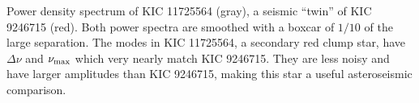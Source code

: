 \label{fig:twin}
Power density spectrum of KIC 11725564 (gray), a seismic ``twin'' of KIC 9246715 (red). Both power spectra are smoothed with a boxcar of $1/10$ of the large separation. The modes in KIC 11725564, a secondary red clump star, have $\Delta \nu$ and $\nu_{\rm{max}}$ which very nearly match KIC 9246715. They are less noisy and have larger amplitudes than KIC 9246715, making this star a useful asteroseismic comparison.